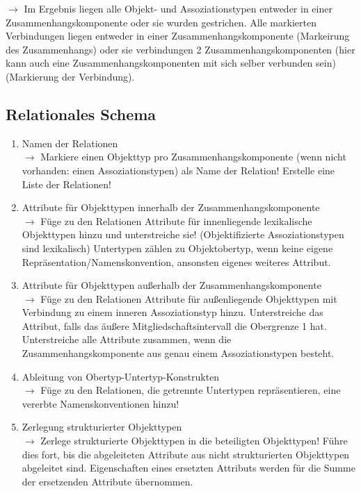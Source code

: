 \documentclass[a4paper,10pt]{scrartcl}
\begin{document}
$\rightarrow$ Im Ergebnis liegen alle Objekt- und Assoziationstypen entweder in einer Zusammenhangskomponente oder sie wurden gestrichen. Alle markierten Verbindungen liegen entweder in einer Zusammenhangskomponente (Markeirung des Zusammenhangs) oder sie verbindungen 2 Zusammenhangskomponenten (hier kann auch eine Zusammenhangskomponenten mit sich selber verbunden sein) (Markierung der Verbindung).
\subsection{Relationales Schema}
\begin{enumerate}
    \item Namen der Relationen \\
    $\rightarrow$ Markiere einen Objekttyp pro Zusammenhangskomponente (wenn nicht vorhanden: einen Assoziationstypen) als Name der Relation! Erstelle eine Liste der Relationen!
    
    \item Attribute für Objekttypen innerhalb der Zusammenhangskomponente \\
    $\rightarrow$ Füge zu den Relationen Attribute für innenliegende lexikalische Objekttypen hinzu und unterstreiche sie! (Objektifizierte Assoziationstypen sind lexikalisch) Untertypen zählen zu Objektobertyp, wenn keine eigene Repräsentation/Namenskonvention, ansonsten eigenes weiteres Attribut. 
    
    \item Attribute für Objekttypen außerhalb der Zusammenhangskomponente \\
    $\rightarrow$ Füge zu den Relationen Attribute für außenliegende Objekttypen mit Verbindung zu einem inneren Assoziationstyp hinzu. Unterstreiche das Attribut, falls das äußere Mitgliedschaftsintervall die Obergrenze 1 hat. Unterstreiche alle Attribute zusammen, wenn die Zusammenhangskomponente aus genau einem Assoziationstypen besteht.
    
    \item Ableitung von Obertyp-Untertyp-Konstrukten \\
    $\rightarrow$ Füge zu den Relationen, die getrennte Untertypen repräsentieren, eine vererbte Namenskonventionen hinzu!
    
    \item Zerlegung strukturierter Objekttypen \\
    $\rightarrow$ Zerlege strukturierte Objekttypen in die beteiligten Objekttypen! Führe dies fort, bis die abgeleiteten Attribute aus nicht strukturierten Objekttypen abgeleitet sind. Eigenschaften eines ersetzten Attributs werden für die Summe der ersetzenden Attribute übernommen.
    

\end{enumerate}
\end{document}

